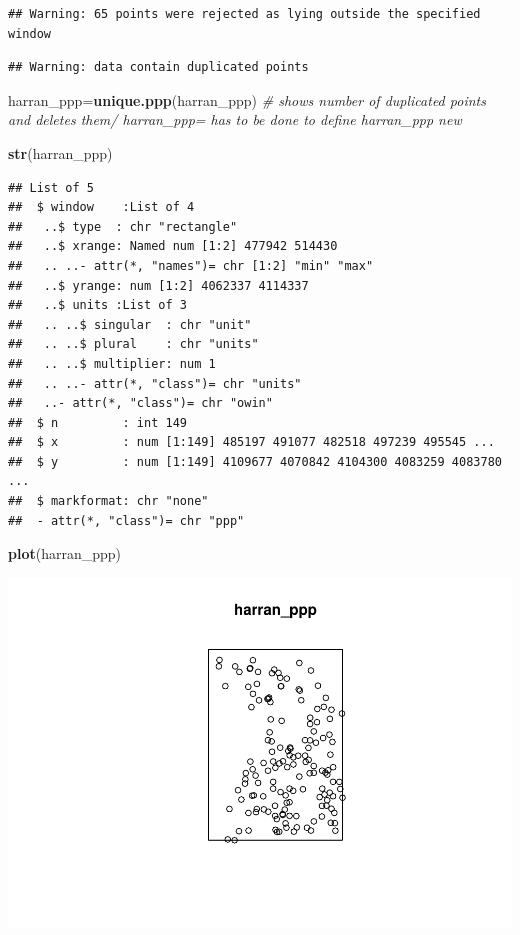 \documentclass[]{article}
\newenvironment{Shaded}{\begin{snugshade}}{\end{snugshade}}
\newcommand{\KeywordTok}[1]{\textcolor[rgb]{0.13,0.29,0.53}{\textbf{{#1}}}}
\newcommand{\CommentTok}[1]{\textcolor[rgb]{0.56,0.35,0.01}{\textit{{#1}}}}
\newcommand{\NormalTok}[1]{{#1}}
\begin{document}
\begin{verbatim}
## Warning: 65 points were rejected as lying outside the specified window
\end{verbatim}

\begin{verbatim}
## Warning: data contain duplicated points
\end{verbatim}

\begin{Shaded}
\begin{Highlighting}[]
\NormalTok{harran_ppp=}\KeywordTok{unique.ppp}\NormalTok{(harran_ppp) }\CommentTok{# shows number of duplicated points and deletes them/ harran_ppp= has to be done to define harran_ppp new}

\KeywordTok{str}\NormalTok{(harran_ppp)}
\end{Highlighting}
\end{Shaded}

\begin{verbatim}
## List of 5
##  $ window    :List of 4
##   ..$ type  : chr "rectangle"
##   ..$ xrange: Named num [1:2] 477942 514430
##   .. ..- attr(*, "names")= chr [1:2] "min" "max"
##   ..$ yrange: num [1:2] 4062337 4114337
##   ..$ units :List of 3
##   .. ..$ singular  : chr "unit"
##   .. ..$ plural    : chr "units"
##   .. ..$ multiplier: num 1
##   .. ..- attr(*, "class")= chr "units"
##   ..- attr(*, "class")= chr "owin"
##  $ n         : int 149
##  $ x         : num [1:149] 485197 491077 482518 497239 495545 ...
##  $ y         : num [1:149] 4109677 4070842 4104300 4083259 4083780 ...
##  $ markformat: chr "none"
##  - attr(*, "class")= chr "ppp"
\end{verbatim}

\begin{Shaded}
\begin{Highlighting}[]
\KeywordTok{plot}\NormalTok{(harran_ppp)}
\end{Highlighting}
\end{Shaded}

\includegraphics{HarranPlain_files/figure-latex/unnamed-chunk-2-1.pdf}
\end{document}
